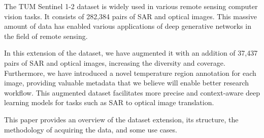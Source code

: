 The TUM Sentinel 1-2 dataset\cite{tumsen12} is widely used in various remote sensing computer vision tasks. It consists of 282,384 pairs of SAR and optical images. This massive amount of data has enabled various applications of deep generative networks in the field of remote sensing\cite{Zhang2023}.

In this extension of the dataset, we have augmented it with an addition of 37,437 pairs of SAR and optical images, increasing the diversity and coverage. Furthermore, we have introduced a novel temperature region annotation for each image, providing valuable metadata that we believe will enable better research workflow. This augmented dataset facilitates more precise and context-aware deep learning models for tasks such as SAR to optical image translation.

This paper provides an overview of the dataset extension, its structure, the methodology of acquiring the data, and some use cases.